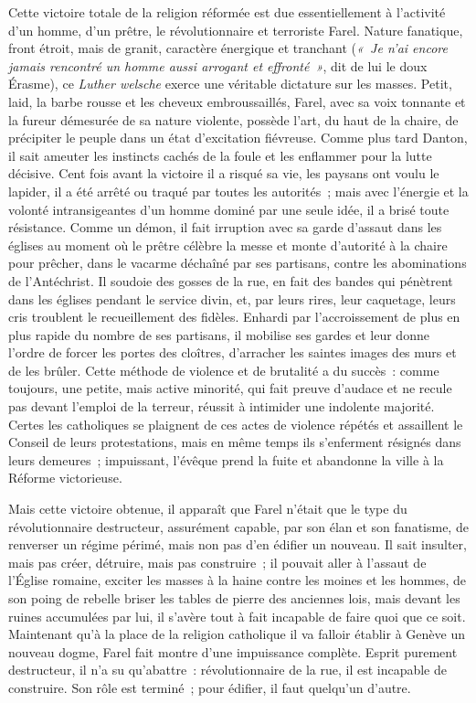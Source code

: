 \documentclass[french,twoside]{book} %
\begin{document}
Cette victoire totale de la religion réformée est due essentiellement à l’activité d’un homme, d’un prêtre, le révolutionnaire et terroriste Farel. Nature fanatique, front étroit, mais de granit, caractère énergique et tranchant (\emph{« Je n’ai encore jamais rencontré un homme aussi arrogant et effronté »}, dit de lui le doux Érasme), ce \emph{Luther welsche} exerce une véritable dictature sur les masses. Petit, laid, la barbe rousse et les cheveux embroussaillés, Farel, avec sa voix tonnante et la fureur démesurée de sa nature violente, possède l’art, du haut de la chaire, de précipiter le peuple dans un état d’excitation fiévreuse. Comme plus tard Danton, il sait ameuter les instincts cachés de la foule et les enflammer pour la lutte décisive. Cent fois avant la victoire il a risqué sa vie, les paysans ont voulu le lapider, il a été arrêté ou traqué par toutes les autorités ; mais avec l’énergie et la volonté intransigeantes d’un homme dominé par une seule idée, il a brisé toute résistance. Comme un démon, il fait irruption avec sa garde d’assaut dans les églises au moment où le prêtre célèbre la messe et monte d’autorité à la chaire pour prêcher, dans le vacarme déchaîné par ses partisans, contre les abominations de l’Antéchrist. Il soudoie des gosses de la rue, en fait des bandes qui pénètrent dans les églises pendant le service divin, et, par leurs rires, leur caquetage, leurs cris troublent le recueillement des fidèles. Enhardi par l’accroissement de plus en plus rapide du nombre de ses partisans, il mobilise ses gardes et leur donne l’ordre de forcer les portes des cloîtres, d’arracher les saintes images des murs et de les brûler. Cette méthode de violence et de brutalité a du succès : comme toujours, une petite, mais active minorité, qui fait preuve d’audace et ne recule pas devant l’emploi de la terreur, réussit à intimider une indolente majorité. Certes les catholiques se plaignent de ces actes de violence répétés et assaillent le Conseil de leurs protestations, mais en même temps ils s’enferment résignés dans leurs demeures ; impuissant, l’évêque prend la fuite et abandonne la ville à la Réforme victorieuse.\par
Mais cette victoire obtenue, il apparaît que Farel n’était que le type du révolutionnaire destructeur, assurément capable, par son élan et son fanatisme, de renverser un régime périmé, mais non pas d’en édifier un nouveau. Il sait insulter, mais pas créer, détruire, mais pas construire ; il pouvait aller à l’assaut de l’Église romaine, exciter les masses à la haine contre les moines et les hommes, de son poing de rebelle briser les tables de pierre des anciennes lois, mais devant les ruines accumulées par lui, il s’avère tout à fait incapable de faire quoi que ce soit. Maintenant qu’à la place de la religion catholique il va falloir établir à Genève un nouveau dogme, Farel fait montre d’une impuissance complète. Esprit purement destructeur, il n’a su qu’abattre : révolutionnaire de la rue, il est incapable de construire. Son rôle est terminé ; pour édifier, il faut quelqu’un d’autre.\par
\end{document}
